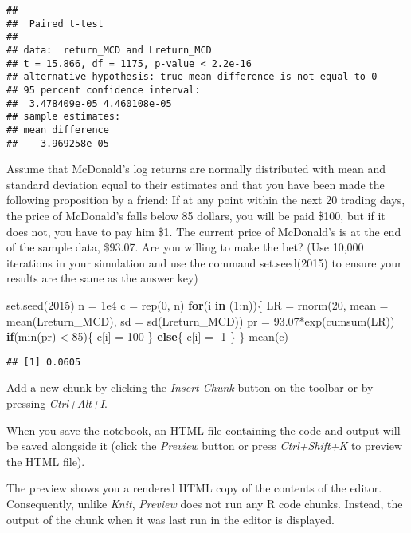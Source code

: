 \documentclass[
]{article}
\newenvironment{Shaded}{\begin{snugshade}}{\end{snugshade}}
\newcommand{\AttributeTok}[1]{\textcolor[rgb]{0.77,0.63,0.00}{#1}}
\newcommand{\ControlFlowTok}[1]{\textcolor[rgb]{0.13,0.29,0.53}{\textbf{#1}}}
\newcommand{\DecValTok}[1]{\textcolor[rgb]{0.00,0.00,0.81}{#1}}
\newcommand{\FloatTok}[1]{\textcolor[rgb]{0.00,0.00,0.81}{#1}}
\newcommand{\FunctionTok}[1]{\textcolor[rgb]{0.00,0.00,0.00}{#1}}
\newcommand{\NormalTok}[1]{#1}
\newcommand{\OtherTok}[1]{\textcolor[rgb]{0.56,0.35,0.01}{#1}}
\newcommand{\SpecialCharTok}[1]{\textcolor[rgb]{0.00,0.00,0.00}{#1}}
\begin{document}
\begin{verbatim}
## 
##  Paired t-test
## 
## data:  return_MCD and Lreturn_MCD
## t = 15.866, df = 1175, p-value < 2.2e-16
## alternative hypothesis: true mean difference is not equal to 0
## 95 percent confidence interval:
##  3.478409e-05 4.460108e-05
## sample estimates:
## mean difference 
##    3.969258e-05
\end{verbatim}

Assume that McDonald's log returns are normally distributed with mean
and standard deviation equal to their estimates and that you have been
made the following proposition by a friend: If at any point within the
next 20 trading days, the price of McDonald's falls below 85 dollars,
you will be paid \$100, but if it does not, you have to pay him \$1. The
current price of McDonald's is at the end of the sample data, \$93.07.
Are you willing to make the bet? (Use 10,000 iterations in your
simulation and use the command set.seed(2015) to ensure your results are
the same as the answer key)

\begin{Shaded}
\begin{Highlighting}[]
\FunctionTok{set.seed}\NormalTok{(}\DecValTok{2015}\NormalTok{)}
\NormalTok{n }\OtherTok{=} \FloatTok{1e4}
\NormalTok{c }\OtherTok{=} \FunctionTok{rep}\NormalTok{(}\DecValTok{0}\NormalTok{, n)}
\ControlFlowTok{for}\NormalTok{(i }\ControlFlowTok{in}\NormalTok{ (}\DecValTok{1}\SpecialCharTok{:}\NormalTok{n))\{}
\NormalTok{  LR }\OtherTok{=} \FunctionTok{rnorm}\NormalTok{(}\DecValTok{20}\NormalTok{, }\AttributeTok{mean =} \FunctionTok{mean}\NormalTok{(Lreturn\_MCD), }\AttributeTok{sd =} \FunctionTok{sd}\NormalTok{(Lreturn\_MCD))}
\NormalTok{  pr }\OtherTok{=} \FloatTok{93.07}\SpecialCharTok{*}\FunctionTok{exp}\NormalTok{(}\FunctionTok{cumsum}\NormalTok{(LR))}
  \ControlFlowTok{if}\NormalTok{(}\FunctionTok{min}\NormalTok{(pr) }\SpecialCharTok{\textless{}} \DecValTok{85}\NormalTok{)\{}
\NormalTok{    c[i] }\OtherTok{=} \DecValTok{100}
\NormalTok{  \}}
  \ControlFlowTok{else}\NormalTok{\{}
\NormalTok{    c[i] }\OtherTok{=} \SpecialCharTok{{-}}\DecValTok{1}
\NormalTok{  \}}
\NormalTok{\}}
\FunctionTok{mean}\NormalTok{(c)}
\end{Highlighting}
\end{Shaded}

\begin{verbatim}
## [1] 0.0605
\end{verbatim}

Add a new chunk by clicking the \emph{Insert Chunk} button on the
toolbar or by pressing \emph{Ctrl+Alt+I}.

When you save the notebook, an HTML file containing the code and output
will be saved alongside it (click the \emph{Preview} button or press
\emph{Ctrl+Shift+K} to preview the HTML file).

The preview shows you a rendered HTML copy of the contents of the
editor. Consequently, unlike \emph{Knit}, \emph{Preview} does not run
any R code chunks. Instead, the output of the chunk when it was last run
in the editor is displayed.
\end{document}
